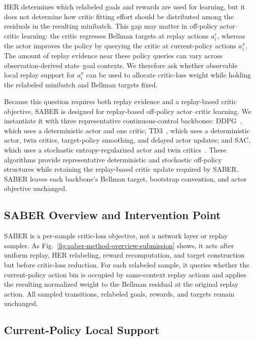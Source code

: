 \documentclass[letterpaper]{article}
\begin{document}
HER determines which relabeled goals and rewards are used for
learning, but it does not determine how critic fitting effort should
be distributed among the residuals in the resulting minibatch.  This
gap may matter in off-policy actor--critic learning: the critic
regresses Bellman targets at replay actions \(a_i^r\), whereas the
actor improves the policy by querying the critic at current-policy
actions \(a_i^\pi\).  The amount of replay evidence near these policy
queries can vary across observation-derived state--goal contexts.  We therefore ask
whether observable local replay support for \(a_i^\pi\) can be used
to allocate critic-loss weight while holding the relabeled minibatch
and Bellman targets fixed.

Because this question requires both replay evidence and a replay-based
critic objective, SABER is designed for replay-based off-policy
actor--critic learning.  We instantiate it with three representative
continuous-control backbones: DDPG~\citep{lillicrap2016ddpg}, which uses a deterministic actor
and one critic; TD3~\citep{fujimoto2018td3}, which uses a deterministic actor, twin critics,
target-policy smoothing, and delayed actor updates; and SAC, which
uses a stochastic entropy-regularized actor and twin
critics~\citep{haarnoja2018sac}.
These algorithms provide representative deterministic and stochastic
off-policy structures while retaining the replay-based critic update
required by SABER.  SABER leaves each backbone's Bellman target,
bootstrap convention, and actor objective unchanged.

\subsection{SABER Overview and Intervention Point}

SABER is a per-sample critic-loss objective, not a network layer or
replay sampler. As Fig.~\ref{fig:saber-method-overview-submission}
shows, it acts after uniform replay, HER relabeling, reward
recomputation, and target construction but before critic-loss
reduction. For each relabeled sample, it queries whether the
current-policy action bin is occupied by same-context replay actions
and applies the resulting normalized weight to the Bellman residual
at the original replay action. All sampled transitions, relabeled
goals, rewards, and targets remain unchanged.

\subsection{Current-Policy Local Support}
\end{document}
